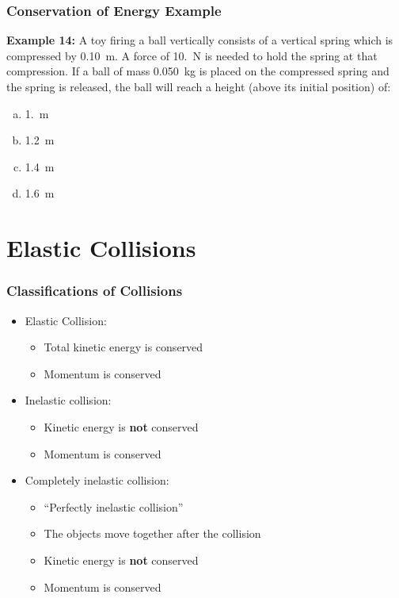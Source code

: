 \documentclass[12pt,compress,aspectratio=169]{beamer}
\begin{document}
\begin{frame}
  \frametitle{Conservation of Energy Example}
  \textbf{Example 14:} A toy firing a ball vertically consists of a vertical
  spring which is compressed by \SI{.10}{\metre}. A force of \SI{10.}{\newton}
  is needed to hold the spring at that compression. If a ball of mass
  \SI{.050}{\kilo\gram} is placed on the compressed spring and the spring is
  released, the ball will reach a height (above its initial position) of:
  \begin{enumerate}[(a)]
  \item \SI{1.}{\metre}
  \item \SI{1.2}{\metre}
  \item \SI{1.4}{\metre}
  \item \SI{1.6}{\metre}
  \end{enumerate}
\end{frame}


\section{Elastic Collisions}

\begin{frame}
  \frametitle{Classifications of Collisions}
  \begin{itemize}
  \item Elastic Collision:
    \begin{itemize}
    \item Total kinetic energy is conserved
    \item<alert@2> Momentum is conserved
    \end{itemize}
  \item Inelastic collision:
    \begin{itemize}
    \item Kinetic energy is \textbf{not} conserved
    \item<alert@2> Momentum is conserved
    \end{itemize}
  \item Completely inelastic collision:
    \begin{itemize}
    \item ``Perfectly inelastic collision''
    \item The objects move together after the collision
    \item Kinetic energy is \textbf{not} conserved
    \item<alert@2> Momentum is conserved
    \end{itemize}
  \end{itemize}
\end{frame}
\end{document}

